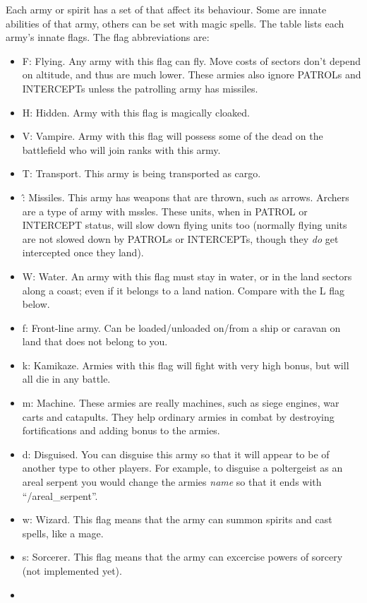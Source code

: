 Each army or spirit has a set of  that affect its
behaviour.  Some are innate abilities of that army, others can be set
with magic spells.  The table lists each army's innate flags.  The
flag abbreviations are:
\begin{itemize}
\item
F: Flying.  Any army with this flag can fly.  Move costs of sectors
don't depend on altitude, and thus are much lower.  These armies also
ignore PATROLs and INTERCEPTs unless the patrolling army has missiles.
\item
H:  Hidden.  Army with this flag is magically cloaked.
\item
V:  Vampire.  Army with this flag will possess some of the dead
on the battlefield who will join ranks with this army.
\item
T:  Transport.  This army is being transported as cargo.
\item
\^:  Missiles.  This army has weapons that are thrown, such as arrows.
Archers are a type of army with mssles.  These units, when in PATROL
or INTERCEPT status, will slow down flying units too (normally flying
units are not slowed down by PATROLs or INTERCEPTs, though they
\emph{do} get intercepted once they land).
\item
W:  Water.  An army with this flag must stay in water, or in the land
sectors along a coast; even if it belongs to a land nation.  Compare
with the L flag below.
\item
f: Front-line army.  Can be loaded/unloaded on/from a ship or caravan on
land that does not belong to you.
\item
k:  Kamikaze.  Armies with this flag will fight with very high bonus,
but will all die in any battle.
\item
m:  Machine.  These armies are really machines, such as siege engines,
war carts and catapults.  They help ordinary armies in combat by
destroying fortifications and adding bonus to the armies.
\item
d: Disguised.  You can disguise this army so that it will appear to be
of another type to other players.  For example, to disguise a
poltergeist as an areal serpent you would change the armies
\emph{name} so that it ends with ``/areal_serpent''.
\item
w:  Wizard.  This flag means that the army can summon spirits
and cast spells, like a mage.
\item
s:  Sorcerer.  This flag means that the army can excercise powers
of sorcery (not implemented yet).
\item

\end{itemize}
